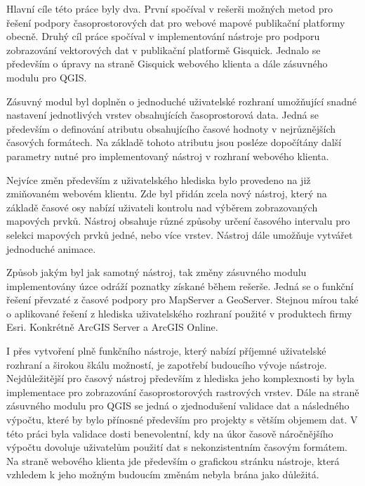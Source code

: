 \newpage
{}

Hlavní cíle této práce byly dva. První spočíval v rešerši možných
metod pro řešení podpory časoprostorových dat pro webové mapové
publikační platformy obecně. Druhý cíl práce spočíval v implementování
nástroje pro podporu zobrazování vektorových dat v publikační
platformě Gisquick. Jednalo se především o úpravy na straně Gisquick
webového klienta a dále zásuvného modulu pro QGIS.

Zásuvný modul byl doplněn o jednoduché uživatelské rozhraní umožňující
snadné nastavení jednotlivých vrstev obsahujících časoprostorová
data. Jedná se především o definování atributu obsahujícího časové
hodnoty v nejrůznějších časových formátech. Na základě tohoto atributu
jsou posléze dopočítány další parametry nutné pro implementovaný
nástroj v rozhraní webového klienta.

Nejvíce změn především z uživatelského hlediska bylo provedeno na již
zmiňovaném webovém klientu. Zde byl přidán zcela nový nástroj, který
na základě časové osy nabízí uživateli kontrolu nad výběrem
zobrazovaných mapových prvků. Nástroj obsahuje různé způsoby určení
časového intervalu pro selekci mapových prvků jedné, nebo více
vrstev. Nástroj dále umožňuje vytvářet jednoduché animace.

Způsob jakým byl jak samotný nástroj, tak změny zásuvného modulu
implementovány úzce odráží poznatky získané během rešerše. Jedná se o
funkční řešení převzaté z časové podpory pro MapServer a
GeoServer. Stejnou mírou také o aplikované řešení z hlediska
uživatelského rozhraní použité v produktech firmy Esri. Konkrétně
ArcGIS Server a ArcGIS Online.

I přes vytvoření plně funkčního nástroje, který nabízí příjemné
uživatelské rozhraní a širokou škálu možností, je zapotřebí budoucího
vývoje nástroje. Nejdůležitější pro časový nástroj především z
hlediska jeho komplexnosti by byla implementace pro zobrazování
časoprostorových rastrových vrstev. Dále na straně zásuvného modulu
pro QGIS se jedná o zjednodušení validace dat a následného výpočtu,
které by bylo přínosné především pro projekty s větším objemem dat. V
této práci byla validace dosti benevolentní, kdy na úkor časově
náročnějšího výpočtu dovoluje uživatelům použití dat s nekonzistentním
časovým formátem. Na straně webového klienta jde především o grafickou
stránku nástroje, která vzhledem k jeho možným budoucím změnám nebyla
brána jako důležitá.

